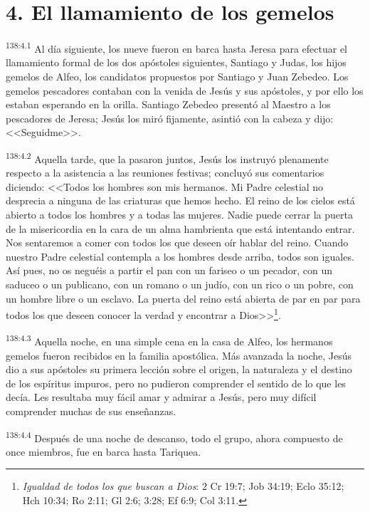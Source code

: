 \section*{4. El llamamiento de los gemelos}
\par 
\textsuperscript{138:4.1} Al día siguiente, los nueve fueron en barca hasta Jeresa para efectuar el llamamiento formal de los dos apóstoles siguientes, Santiago y Judas, los hijos gemelos de Alfeo, los candidatos propuestos por Santiago y Juan Zebedeo. Los gemelos pescadores contaban con la venida de Jesús y sus apóstoles, y por ello los estaban esperando en la orilla. Santiago Zebedeo presentó al Maestro a los pescadores de Jeresa; Jesús los miró fijamente, asintió con la cabeza y dijo: <<Seguidme>>.

\par 
\textsuperscript{138:4.2} Aquella tarde, que la pasaron juntos, Jesús los instruyó plenamente respecto a la asistencia a las reuniones festivas; concluyó sus comentarios diciendo: <<Todos los hombres son mis hermanos. Mi Padre celestial no desprecia a ninguna de las criaturas que hemos hecho. El reino de los cielos está abierto a todos los hombres y a todas las mujeres. Nadie puede cerrar la puerta de la misericordia en la cara de un alma hambrienta que está intentando entrar. Nos sentaremos a comer con todos los que deseen oír hablar del reino. Cuando nuestro Padre celestial contempla a los hombres desde arriba, todos son iguales. Así pues, no os neguéis a partir el pan con un fariseo o un pecador, con un saduceo o un publicano, con un romano o un judío, con un rico o un pobre, con un hombre libre o un esclavo. La puerta del reino está abierta de par en par para todos los que deseen conocer la verdad y encontrar a Dios>>\footnote{\textit{Igualdad de todos los que buscan a Dios}: 2 Cr 19:7; Job 34:19; Eclo 35:12; Hch 10:34; Ro 2:11; Gl 2:6; 3:28; Ef 6:9; Col 3:11.}.

\par 
\textsuperscript{138:4.3} Aquella noche, en una simple cena en la casa de Alfeo, los hermanos gemelos fueron recibidos en la familia apostólica. Más avanzada la noche, Jesús dio a sus apóstoles su primera lección sobre el origen, la naturaleza y el destino de los espíritus impuros, pero no pudieron comprender el sentido de lo que les decía. Les resultaba muy fácil amar y admirar a Jesús, pero muy difícil comprender muchas de sus enseñanzas.

\par 
\textsuperscript{138:4.4} Después de una noche de descanso, todo el grupo, ahora compuesto de once miembros, fue en barca hasta Tariquea.

